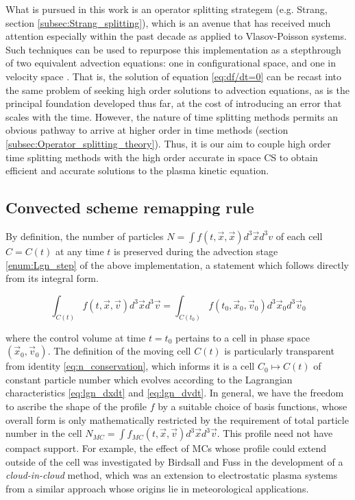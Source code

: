 \documentclass[11pt,titlepage]{report}
\begin{document}
What is pursued in this work is an operator splitting strategem (e.g. Strang, section \ref{subsec:Strang_splitting}), which is an avenue that has received much attention especially within the past decade as applied to Vlasov-Poisson systems. Such techniques can be used to repurpose this implementation as a stepthrough of two equivalent advection equations: one in configurational space, and one in velocity space \cite{Guclu14}. That is, the solution of equation \eqref{eq:df/dt=0} can be recast into the same problem of seeking high order solutions to advection equations, as is the principal foundation developed thus far, at the cost of introducing an error that scales with the time. However, the nature of time splitting methods permits an obvious pathway to arrive at higher order in time methods (section \ref{subsec:Operator_splitting_theory}). Thus, it is our aim to couple high order time splitting methods with the high order accurate in space CS to obtain efficient and accurate solutions to the plasma kinetic equation.

\subsection{Convected scheme remapping rule} \label{subsec:CS_remapping_rule}

\indent \indent By definition, the number of particles $N = \int f(t,\vec{x},\vec{x})d^3\vec{x}d^3{v}$ of each cell $C = C(t)$ at any time $t$ is preserved during the advection stage \ref{enum:Lgn_step} of the above implementation, a statement which follows directly from its integral form.

\begin{equation}\label{eq:n_conservation}\int_{C(t)} f(t,\vec{x},\vec{v}) d^3\vec{x}d^3\vec{v} = \int_{C(t_0)} f(t_0,\vec{x}_0,\vec{v}_0) d^3\vec{x}_0d^3\vec{v}_0\end{equation}

\noindent where the control volume at time $t = t_0$ pertains to a cell in phase space $(\vec{x}_0, \vec{v}_0)$. The definition of the moving cell $C(t)$ is particularly transparent from identity \eqref{eq:n_conservation}, which informs it is a cell $C_0 \mapsto C(t)$ of constant particle number which evolves according to the Lagrangian characteristics \eqref{eq:lgn_dxdt} and \eqref{eq:lgn_dvdt}. In general, we have the freedom to ascribe the shape of the profile $f$ by a suitable choice of basis functions, whose overall form is only mathematically restricted by the requirement of total particle number in the cell $N_{MC} = \int f_{MC}(t,\vec{x},\vec{v})d^3\vec{x}d^3\vec{v}$. This profile need not have compact support. For example, the effect of MCs whose profile could extend outside of the cell was investigated by Birdsall and Fuss \cite{Birdsall69} in the development of a \emph{cloud-in-cloud} method, which was an extension to electrostatic plasma systems from a similar approach whose origins lie in meteorological applications.
\end{document}
